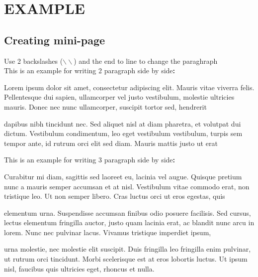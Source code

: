 \chapter{EXAMPLE}

\section{Creating mini-page}

Use 2 backslashes ($\backslash\backslash$) and the end to line to change
the paraghraph\\

This is an example for writing 2 paragraph side by side\textbf{:}\\

\begin{minipage}{0.45\textwidth} %
Lorem ipsum dolor sit amet, consectetur adipiscing elit. Mauris vitae viverra
felis. Pellentesque dui sapien, ullamcorper vel justo vestibulum, molestie
ultricies mauris. Donec nec nunc ullamcorper, suscipit tortor sed, hendrerit
\end{minipage}
\hspace{0.5cm} %
\begin{minipage}{0.45\textwidth}
dapibus nibh tincidunt nec. Sed aliquet nisl at diam pharetra, et volutpat dui
dictum. Vestibulum condimentum, leo eget vestibulum vestibulum, turpis sem
tempor ante, id rutrum orci elit sed diam. Mauris mattis justo ut erat
\end{minipage}

\vspace{0.5cm} %
This is an example for writing 3 paragraph side by side\textbf{:}\\

\begin{minipage}{0.30\textwidth}
Curabitur mi diam, sagittis sed laoreet eu, lacinia vel augue. Quisque pretium
nunc a mauris semper accumsan et at nisl. Vestibulum vitae commodo erat, non
tristique leo. Ut non semper libero. Cras luctus orci ut eros egestas, quis
\end{minipage}
\hspace{0.5cm}
\begin{minipage}{0.30\textwidth}
elementum urna. Suspendisse accumsan finibus odio posuere facilisis. Sed
cursus, lectus elementum fringilla auctor, justo quam lacinia erat, ac blandit
nunc arcu in lorem. Nunc nec pulvinar lacus. Vivamus tristique imperdiet ipsum,
\end{minipage}
\hspace{0.5cm}
\begin{minipage}{0.30\textwidth}
urna molestie, nec molestie elit suscipit. Duis fringilla leo fringilla enim
pulvinar, ut rutrum orci tincidunt. Morbi scelerisque est at eros lobortis
luctus. Ut ipsum nisl, faucibus quis ultricies eget, rhoncus et nulla.
\end{minipage}\\


